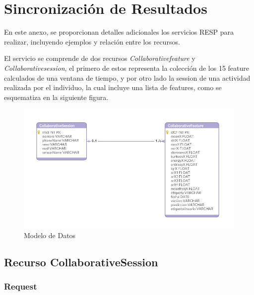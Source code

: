 


\chapter{Sincronización de Resultados}

\label{chapA:rest-api}

En este anexo, se proporcionan detalles adicionales los servicios RESP para realizar, incluyendo ejemplos y relación entre los recursos.

El servicio se comprende de dos recursos \textit{Collaborativefeature} y \textit{Collaborativesession}, el primero de estos representa la colección de los 15 feature calculados de una ventana de tiempo, y por otro lado la session de una actividad realizada por el individuo, la cual incluye una lista de features, como se esquematiza en la siguiente figura.

\begin{figure}[!htbp]
	\centering
	\includegraphics[width=0.7\linewidth]{anexos/der}
	\caption[Modelo de Datos]{\label{fig:der}Modelo de Datos}
\end{figure}

\section{Recurso CollaborativeSession}

\subsection{Request}

